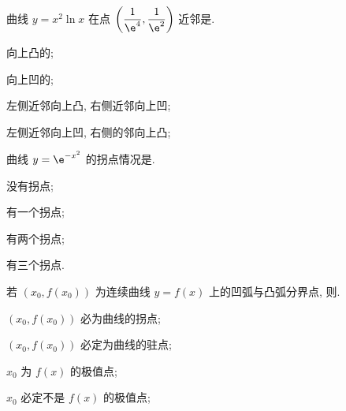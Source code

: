\begin{problem}
曲线 $y = x^{2}\ln x$ 在点
$\displaystyle \left( \frac{1}{\e^{4}},\frac{1}{\e^{2}} \right)$ 近邻是.

\begin{abcd} \item 向上凸的; \item 向上凹的;

\item 左侧近邻向上凸, 右侧近邻向上凹;

\item 左侧近邻向上凹, 右侧的邻向上凸;

\end{abcd}

\end{problem}

\begin{problem}
曲线 $y = \e^{- x^{2}}$ 的拐点情况是.

\begin{abcd} \item 没有拐点;

\item 有一个拐点;

\item 有两个拐点;

\item 有三个拐点.

\end{abcd}


\end{problem}

\begin{problem}
若 $\left( x_{0},f\left( x_{0} \right) \right)$ 为连续曲线
$y = f\left( x \right)$ 上的凹弧与凸弧分界点, 则.

\begin{abcd} \item $\left( x_{0},f\left( x_{0} \right) \right)$ 必为曲线的拐点;

\item $\left( x_{0},f\left( x_{0} \right) \right)$ 必定为曲线的驻点;

\item $x_{0}$ 为 $f\left( x \right)$ 的极值点;

\item $x_{0}$ 必定不是 $f\left( x \right)$ 的极值点;

\end{abcd}

\end{problem}


